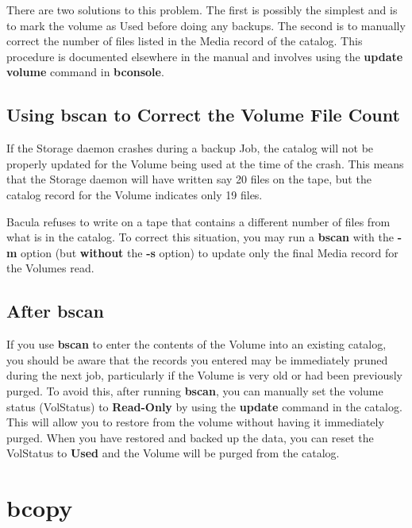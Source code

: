 There are two solutions to this problem. The first is possibly the simplest
and is to mark the volume as Used before doing any backups.  The second is
to manually correct the number of files listed in the Media record of the
catalog.  This procedure is documented elsewhere in the manual and involves
using the {\bf update volume} command in {\bf bconsole}.

\subsection{Using bscan to Correct the Volume File Count}

If the Storage daemon crashes during a backup Job, the catalog will not be
properly updated for the Volume being used at the time of the crash. This
means that the Storage daemon will have written say 20 files on the tape, but
the catalog record for the Volume indicates only 19 files. 

Bacula refuses to write on a tape that contains a different number of files
from what is in the catalog. To correct this situation, you may run a {\bf
bscan} with the {\bf -m} option (but {\bf without} the {\bf -s} option) to
update only the final Media record for the Volumes read. 

\subsection{After bscan}

If you use {\bf bscan} to enter the contents of the Volume into an existing
catalog, you should be aware that the records you entered may be immediately
pruned during the next job, particularly if the Volume is very old or had been
previously purged. To avoid this, after running {\bf bscan}, you can manually
set the volume status (VolStatus) to {\bf Read-Only} by using the {\bf update}
command in the catalog. This will allow you to restore from the volume without
having it immediately purged. When you have restored and backed up the data,
you can reset the VolStatus to {\bf Used} and the Volume will be purged from
the catalog. 

\section{bcopy}
\label{bcopy}

